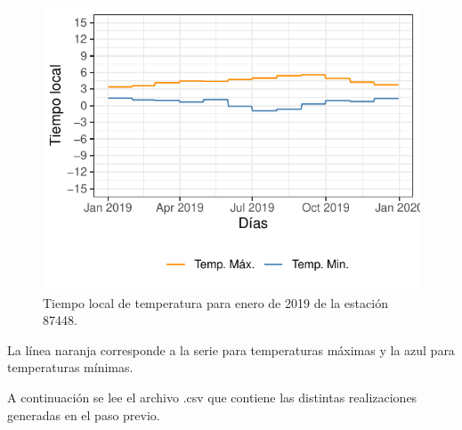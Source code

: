 \documentclass[
  12pt]{article}
\newenvironment{Shaded}{}{}
\newcommand{\CommentTok}[1]{\textcolor[rgb]{0.38,0.63,0.69}{\textit{#1}}}
\newcommand{\DataTypeTok}[1]{\textcolor[rgb]{0.56,0.13,0.00}{#1}}
\newcommand{\KeywordTok}[1]{\textcolor[rgb]{0.00,0.44,0.13}{\textbf{#1}}}
\newcommand{\NormalTok}[1]{#1}
\newcommand{\OperatorTok}[1]{\textcolor[rgb]{0.40,0.40,0.40}{#1}}
\newcommand{\StringTok}[1]{\textcolor[rgb]{0.25,0.44,0.63}{#1}}
\begin{document}
\begin{figure}[H]

{\centering \includegraphics{Manual_Generador_files/figure-latex/campo-temp-ind-1} 

}

\caption{Tiempo local de temperatura para enero de 2019 de la estación 87448.}\label{fig:campo-temp-ind}
\end{figure}

La línea naranja corresponde a la serie para temperaturas máximas y la azul para temperaturas mínimas.

A continuación se lee el archivo .csv que contiene las distintas realizaciones generadas en el paso previo.

\begin{Shaded}
\end{Shaded}
\end{document}
